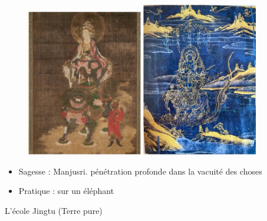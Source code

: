 \begin{figure}
    \centering
    \includegraphics[width=0.45\textwidth]{ConfucianismeTaoismeBouddhismeChinois/Images/Mañjuśrī Sagesse.jpg}
    \includegraphics[width=0.45\textwidth]{ConfucianismeTaoismeBouddhismeChinois/Images/Samantabhadra .jpg}
  
    \label{fig:enter-label}
\end{figure}

\begin{itemize}
    \item Sagesse : Manjusri. pénétration profonde dans la vacuité des choses
    \item Pratique : sur un éléphant
\end{itemize}
 



 


L’école Jingtu (Terre pure)




